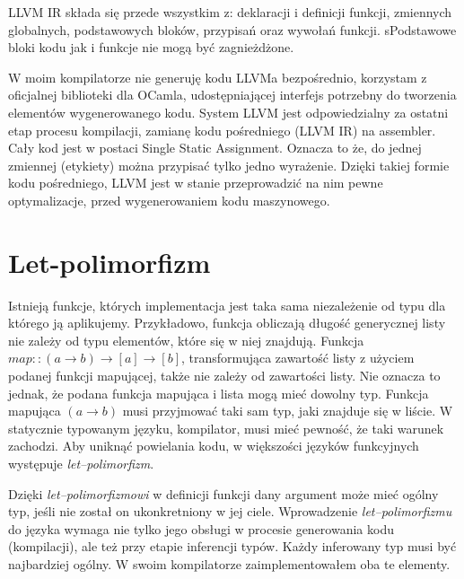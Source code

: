 \documentclass[declaration,shortabstract]{iithesis}
\begin{document}
LLVM IR składa się przede wszystkim z: deklaracji i definicji funkcji, zmiennych 
globalnych, podstawowych bloków, przypisań oraz wywołań funkcji.
sPodstawowe bloki kodu jak i funkcje nie 
mogą być zagnieżdżone. 

W moim kompilatorze nie generuję kodu LLVMa bezpośrednio, 
korzystam z oficjalnej biblioteki dla OCamla, 
udostępniającej interfejs potrzebny do tworzenia elementów wygenerowanego kodu. 
System LLVM 
jest odpowiedzialny za ostatni etap procesu kompilacji, zamianę kodu 
pośredniego (LLVM IR) 
na assembler. Cały kod jest w postaci Single Static Assignment. Oznacza to że, 
do jednej zmiennej (etykiety) można przypisać tylko jedno wyrażenie. 
Dzięki takiej formie kodu pośredniego, LLVM jest w 
stanie przeprowadzić na nim pewne optymalizacje, przed wygenerowaniem kodu 
maszynowego. 



\section{Let-polimorfizm}

Istnieją funkcje, których implementacja jest taka sama niezależenie od typu dla
którego ją aplikujemy. Przykładowo, funkcja obliczają długość generycznej 
listy nie zależy od typu elementów, które się w niej znajdują. 
Funkcja $map :: (a \rightarrow b) \rightarrow [a] \rightarrow [b]$, 
transformująca zawartość listy 
z użyciem podanej funkcji mapującej, także nie zależy od zawartości listy. Nie 
oznacza to jednak, że podana funkcja mapująca i lista mogą mieć dowolny typ. 
Funkcja mapująca $(a \rightarrow b)$ musi przyjmować taki sam typ, jaki 
znajduje się w liście. W statycznie typowanym języku, kompilator, musi mieć 
pewność, że taki warunek zachodzi. Aby uniknąć powielania kodu, w większości 
języków funkcyjnych 
występuje \textit{let--polimorfizm}. 

Dzięki \textit{let--polimorfizmowi} w definicji funkcji dany argument może 
mieć ogólny typ, jeśli nie został on ukonkretniony w jej ciele.
Wprowadzenie \textit{let--polimorfizmu} do języka wymaga nie tylko jego obsługi 
w procesie generowania kodu (kompilacji), ale też przy etapie inferencji typów.
Każdy inferowany typ musi być najbardziej ogólny. W swoim kompilatorze 
zaimplementowałem oba te elementy. 
\end{document}
